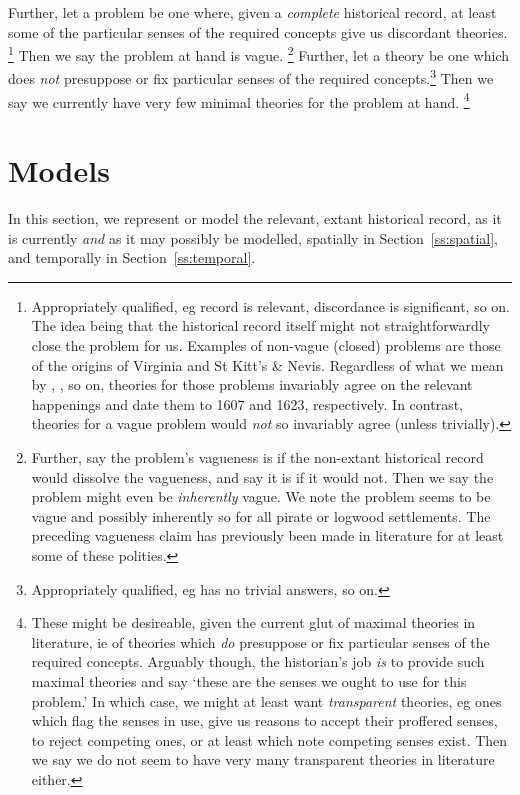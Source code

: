 		Further, let a  problem be one where, given a \emph{complete} historical record, at least some of the particular senses of the required concepts give us discordant theories.%
		\footnote{Appropriately qualified, eg record is relevant, discordance is significant, so on. The idea being that the historical record itself might not straightforwardly close the problem for us. Examples of non-vague (closed) problems are those of the origins of Virginia and St Kitt's \& Nevis. Regardless of what we mean by , , so on, theories for those problems invariably agree on the relevant happenings and date them to 1607 and 1623, respectively. In contrast, theories for a vague problem would \emph{not} so invariably agree (unless trivially).}
		Then we say the problem at hand is vague.%
		\footnote{Further, say the problem's vagueness is  if the non-extant historical record would dissolve the vagueness, and say it is  if it would not. Then we say the problem might even be \emph{inherently} vague. We note the problem seems to be vague and possibly inherently so for all pirate or logwood settlements. The preceding vagueness claim has previously been made in literature for at least some of these polities.}
		Further, let a  theory be one which does \emph{not} presuppose or fix particular senses of the required concepts.\footnote{Appropriately qualified, eg has no trivial answers, so on.} Then we say we currently have very few minimal theories for the problem at hand.%
		\footnote{These might be desireable, given the current glut of maximal theories in literature, ie of theories which \emph{do} presuppose or fix particular senses of the required concepts. Arguably though, the historian's job \emph{is} to provide such maximal theories and say `these are the senses we ought to use for this problem.' In which case, we might at least want \emph{transparent} theories, eg ones which flag the senses in use, give us reasons to accept their proffered senses, to reject competing ones, or at least which note competing senses exist. Then we say we do not seem to have very many transparent theories in literature either.}
%
%
%
\section{Models}
\label{s:models}
	In this section, we represent or model the relevant, extant historical record, as it is currently \emph{and} as it may possibly be modelled, spatially in Section~\ref{ss:spatial}, and temporally in Section~\ref{ss:temporal}.
